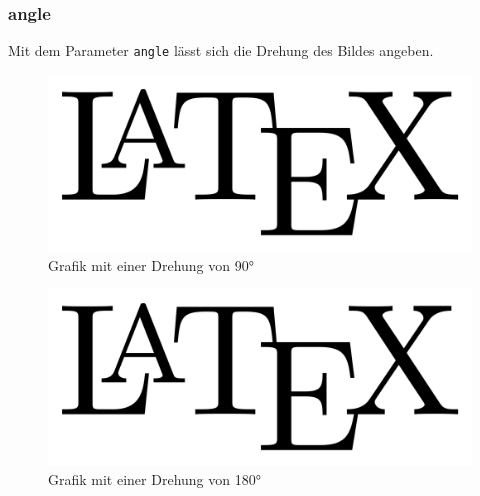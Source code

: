 \documentclass[
12pt,
ngerman
]{scrreprt}
\begin{document}
\subsubsection{angle}
\label{subsubsec:graphics-param-angle}
Mit dem Parameter \verb!angle! lässt sich die Drehung des Bildes angeben.
\begin{figure} [hbt!]
  \centering
  \includegraphics[width=0.8\linewidth, angle=90]{img/latex-logo}
  \caption{Grafik mit einer Drehung von 90°}
  \label{fig:graphics-param-angle-1}
\end{figure}
\begin{figure} [hbt!]
  \centering
  \includegraphics[width=0.8\linewidth, angle=180]{img/latex-logo}
  \caption{Grafik mit einer Drehung von 180°}
  \label{fig:graphics-param-angle-2}
\end{figure}

\newpage
\end{document}
